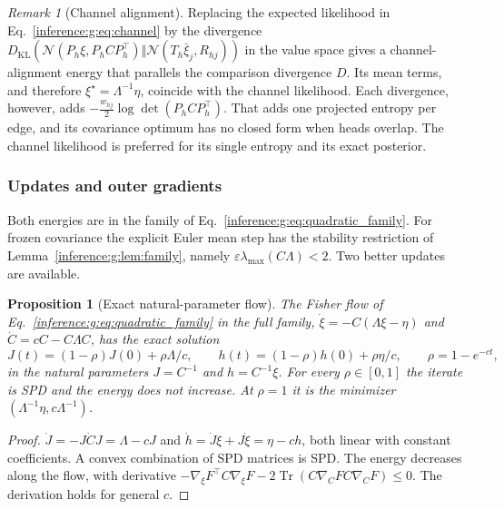 \documentclass[11pt]{article}
\newtheorem{proposition}[theorem]{Proposition}
\theoremstyle{definition}
\theoremstyle{remark}
\newtheorem{remark}[theorem]{Remark}
\providecommand{\KL}{D_{\mathrm{KL}}}
\providecommand{\Tr}{\operatorname{Tr}}
\providecommand{\N}{\mathcal{N}}
\begin{document}
\begin{remark}[Channel alignment]
Replacing the expected likelihood in Eq.~\eqref{inference:g:eq:channel} by the divergence $\KL(\N(P_h\xi,P_hCP_h^\top)\Vert\N(T_h\bar\xi_j,R_{hj}))$ in the value space gives a channel-alignment energy that parallels the comparison divergence $D$. Its mean terms, and therefore $\xi^\star=\Lambda^{-1}\eta$, coincide with the channel likelihood. Each divergence, however, adds $-\tfrac{w_{hj}}{2}\log\det(P_hCP_h^\top)$. That adds one projected entropy per edge, and its covariance optimum has no closed form when heads overlap. The channel likelihood is preferred for its single entropy and its exact posterior.
\end{remark}

\subsubsection{Updates and outer gradients}
\label{inference:g:sec:updates}

Both energies are in the family of Eq.~\eqref{inference:g:eq:quadratic_family}. For frozen covariance the explicit Euler mean step has the stability restriction of Lemma~\ref{inference:g:lem:family}, namely $\varepsilon\lambda_{\max}(C\Lambda)<2$. Two better updates are available.

\begin{proposition}[Exact natural-parameter flow]
\label{inference:g:prop:flow}
The Fisher flow of Eq.~\eqref{inference:g:eq:quadratic_family} in the full family, $\dot\xi=-C(\Lambda\xi-\eta)$ and $\dot C=c C-C\Lambda C$, has the exact solution
\begin{equation}
J(t)=(1-\rho)J(0)+\rho\Lambda/c,\qquad h(t)=(1-\rho)h(0)+\rho\eta/c,\qquad \rho=1-e^{-c t},
\end{equation}
in the natural parameters $J=C^{-1}$ and $h=C^{-1}\xi$. For every $\rho\in[0,1]$ the iterate is SPD and the energy does not increase. At $\rho=1$ it is the minimizer $(\Lambda^{-1}\eta,c\Lambda^{-1})$.
\end{proposition}

\begin{proof}
$\dot J=-J\dot CJ=\Lambda-c J$ and $\dot h=\dot J\xi+J\dot\xi=\eta-c h$, both linear with constant coefficients. A convex combination of SPD matrices is SPD. The energy decreases along the flow, with derivative $-\nabla_\xi F^\top C\nabla_\xi F-2\Tr(C\nabla_CF C\nabla_CF)\le0$. The derivation holds for general $c$.
\end{proof}
\end{document}
